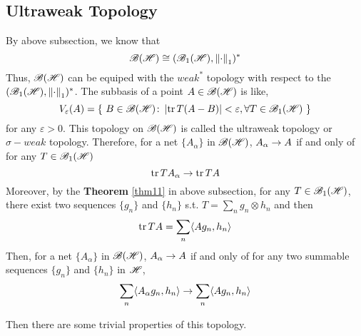 \subsection{Ultraweak Topology}

By above subsection, we know that
\begin{equation*}
	\mathscr{B(H)} \cong (\mathscr{B}_{1}\mathscr{(H)}, \left\lVert\cdot\right\lVert_1)^{*}
\end{equation*}
Thus, $\mathscr{B(H)}$ can be equiped with the $weak^{*}$ topology with respect to the $(\mathscr{B}_{1}\mathscr{(H)}, \left\lVert\cdot\right\lVert_1)^{*}$. The subbasis of a point $A \in \mathscr{B(H)}$ is like,
\begin{equation*}
	V_{\varepsilon}(A) = \{~B \in \mathscr{B(H)} \colon \left\lvert\operatorname{tr}{T(A-B)}\right\lvert < \varepsilon, \forall T \in \mathscr{B}_{1}\mathscr{(H)}~\}
\end{equation*}
for any $\varepsilon > 0$. This topology on $\mathscr{B(H)}$ is called the ultraweak topology or $\sigma-weak$ topology. Therefore, for a net $\{A_{\alpha}\}$ in $\mathscr{B(H)}$, $A_{\alpha} \rightarrow A$ if and only of for any $T \in \mathscr{B}_{1}\mathscr{(H)}$
\begin{equation*}
	\operatorname{tr}{TA_{\alpha}} \rightarrow \operatorname{tr}{TA}
\end{equation*}
Moreover, by the \textbf{Theorem} \ref{thm11} in above subsection, for any $T \in \mathscr{B}_{1}\mathscr{(H)}$, there exist two sequences $\{g_n\}$ and $\{h_n\}$ s.t. $T = \sum_n g_n \otimes h_n$ and then
\begin{equation*}
	\operatorname{tr}{TA} = \sum_n \langle A g_n, h_n \rangle
\end{equation*}
Then, for a net $\{A_{\alpha}\}$ in $\mathscr{B(H)}$, $A_{\alpha} \rightarrow A$ if and only of for any two summable sequences $\{g_n\}$ and $\{h_n\}$ in $\mathscr{H}$, 
\begin{equation*}
	\sum_n \langle A_{\alpha} g_n, h_n \rangle \rightarrow \sum_n \langle A g_n, h_n \rangle
\end{equation*}

Then there are some trivial properties of this topology.

